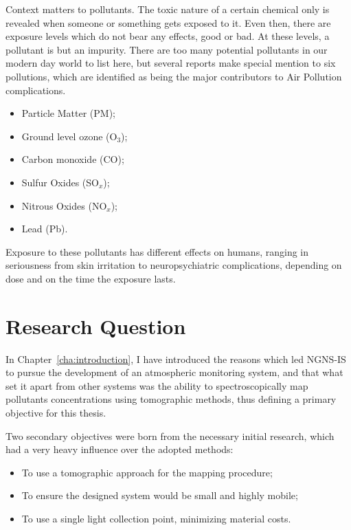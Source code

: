 Context matters to pollutants. The toxic nature of a certain chemical
only is revealed when someone or something gets exposed to it. Even
then, there are exposure levels which do not bear any effects, good or
bad. At these levels, a pollutant is but an impurity. There are too many
potential pollutants in our modern day world to list here, but several
reports make special mention to six pollutions, which are identified as
being the major contributors to Air Pollution complications.

\begin{itemize}
    \item Particle Matter (\gls{PM});
    \item Ground level ozone (O$_3$);
    \item Carbon monoxide (CO);
    \item Sulfur Oxides (SO$_x$);
    \item Nitrous Oxides (NO$_x$);
    \item Lead (Pb).
\end{itemize}

Exposure to these pollutants has different effects on humans, ranging in
seriousness from skin irritation to neuropsychiatric complications,
depending on dose and on the time the exposure lasts.

\section{Research Question}%
\label{sec:research_question}

In Chapter~\ref{cha:introduction}, I have introduced the reasons which
led NGNS-IS to pursue the development of an atmospheric monitoring
system, and that what set it apart from other systems was the ability to
spectroscopically map pollutants concentrations using tomographic
methods, thus defining a primary objective for this thesis.

Two secondary objectives were born from the necessary initial research,
which had a very heavy influence over the adopted methods:
\begin{itemize}
    \item To use a tomographic approach for the mapping procedure;
    \item To ensure the designed system would be small and highly
        mobile;
    \item To use a single light collection point, minimizing material
        costs.
\end{itemize}

